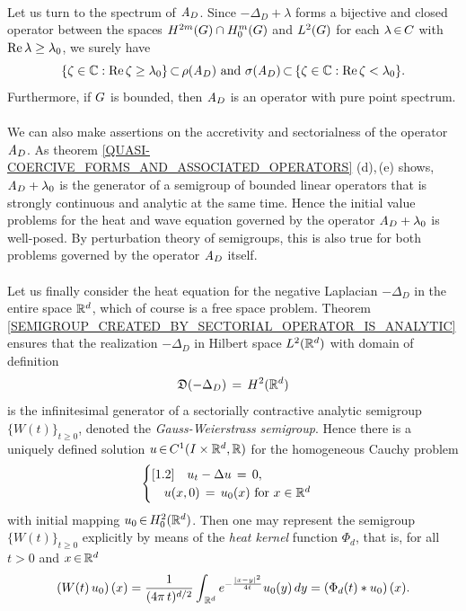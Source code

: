 \documentclass[11pt,twoside]{article}
\begin{document}
\paragraph{} %
Let us turn to the spectrum of $\mathit{A}_D$.
Since $-\Delta_D + \lambda$ forms a bijective and closed operator
between the spaces $H^{2m}(G) \cap H_0^{m}(G)$ and $L^2(G)$
for each $\lambda {\,\in\,} C$ with $\operatorname{Re} \lambda \geq \lambda_0$,
we surely have
\[
\{ \zeta \in {\mathbb{C}}: \operatorname{Re} \zeta \geq \lambda_0\} {\,\subset\,} \rho(\mathit{A}_D)
\mbox{ and }
\sigma(\mathit{A}_D) {\,\subset\,} \{ \zeta \in {\mathbb{C}}: \operatorname{Re} \zeta < \lambda_0\}.
\]
Furthermore,
if $G$ is bounded,
then $\mathit{A}_D$ is an operator with pure point spectrum.

\paragraph{} %
We can also make assertions on the accretivity and sectorialness
of the operator $\mathit{A}_D$.
As theorem \eqref{QUASI-COERCIVE_FORMS_AND_ASSOCIATED_OPERATORS}
(d),\,(e) shows,
$\mathit{A}_D + \lambda_0$ is the generator
of a semigroup of bounded linear operators
that is strongly continuous and analytic at the same time.
Hence the initial value problems for the heat and wave equation
governed by the operator $\mathit{A}_D + \lambda_0$ is well-posed.
By perturbation theory of semigroups,
this is also true for both problems governed by the operator $\mathit{A}_D$ itself.

\paragraph{} %
Let us finally consider the heat equation
for the negative Laplacian $-\Delta_D$ in the entire space ${\mathbb{R}}^d$,
which of course is a free space problem.
Theorem \ref{SEMIGROUP_CREATED_BY_SECTORIAL_OPERATOR_IS_ANALYTIC} ensures
that the realization $-\Delta_D$ in Hilbert space $L^2({\mathbb{R}}^d)$
with domain of definition
\[
\mathfrak{D}(-\Delta_D) \,=\, H^2({\mathbb{R}}^d)
\]
is the infinitesimal generator
of a sectorially contractive analytic semigroup $\{W(t)\}_{t \geq 0}$,
denoted the \textit{Gauss-Weierstrass} \textit{semigroup}.
Hence there is a uniquely defined solution $u {\,\in\,} C^1(I \times {\mathbb{R}}^d,{\mathbb{R}})$
for the homogeneous Cauchy problem
\[
\begin{cases}[1.2]
\quad u_t - \Delta u \,=\, 0,\\
\quad u(x,0)         \,=\, u_0(x) \mbox{ for } x \in {\mathbb{R}}^d \\
\end{cases}
\]
with initial mapping $u_0 {\,\in\,} H_0^{2}({\mathbb{R}}^d)$.
Then one may represent the semigroup $\{W(t)\}_{t \geq 0}$
explicitly by means of the \textit{heat kernel} function $\Phi_d$,
that is,
for all $t > 0$ and $x {\,\in\,} {\mathbb{R}}^d$
\[
(W(t) \, u_0) \, (x)
=
\frac{1}{(4 \pi \, t)^{d/2}}
\int_{\,\Rd} e^{- \frac{\abs{x-y} ^2}{4t}} u_0(y) \, dy
=
(\Phi_d(t) \ast u_0)\,(x).
\]
\end{document}
